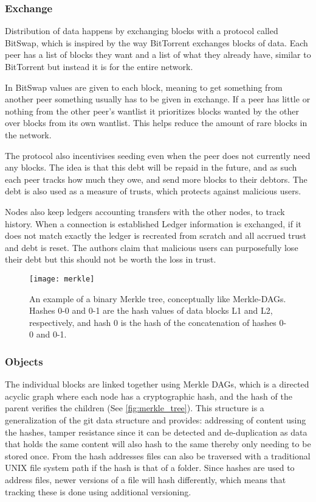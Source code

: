\subsubsection{Exchange}
Distribution of data happens by exchanging blocks with a protocol called BitSwap, which is inspired by the way BitTorrent exchanges blocks of data. Each peer has a list of blocks they want and a list of what they already have, similar to BitTorrent but instead it is for the entire network.

In BitSwap values are given to each block, meaning to get something from another peer something usually has to be given in exchange. If a peer has little or nothing from the other peer's wantlist it prioritizes blocks wanted by the other over blocks from its own wantlist. This helps reduce the amount of rare blocks in the network.

The protocol also incentivises seeding even when the peer does not currently need any blocks. The idea is that this debt will be repaid in the future, and as such each peer tracks how much they owe, and send more blocks to their debtors. The debt is also used as a measure of trusts, which protects against malicious users.

Nodes also keep ledgers accounting transfers with the other nodes, to track history. When a connection is established Ledger information is exchanged, if it does not match exactly the ledger is recreated from scratch and all accrued trust and debt is reset. The authors claim that malicious users can purposefully lose their debt but this should not be worth the loss in trust.

\begin{figure}[ht]
    \centering
    \texttt{[image: merkle]}
    \caption[A Merkle Tree]{An example of a binary Merkle tree, conceptually like Merkle-\acsp{DAG}. Hashes 0-0 and 0-1 are the hash values of data blocks L1 and L2, respectively, and hash 0 is the hash of the concatenation of hashes 0-0 and 0-1.}
    \label{fig:merkle_tree}
\end{figure}

\subsubsection{Objects}
\label{sec:ipfs-objects}
The individual blocks are linked together using Merkle \acp{DAG}, which is a directed acyclic graph where each node has a cryptographic hash, and the hash of the parent verifies the children (See \autoref{fig:merkle_tree}). This structure is a generalization of the git data structure and provides: addressing of content using the hashes, tamper resistance since it can be detected and de-duplication as data that holds the same content will also hash to the same thereby only needing to be stored once. From the hash addresses files can also be traversed with a traditional UNIX file system path if the hash is that of a folder.
Since hashes are used to address files, newer versions of a file will hash differently, which means that tracking these is done using additional versioning.



